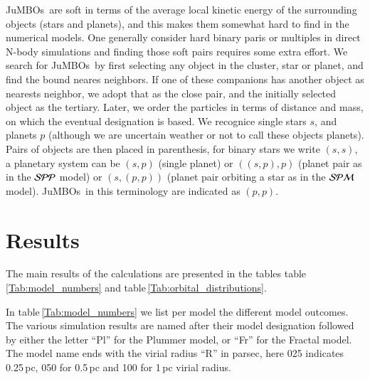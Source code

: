\documentclass[submission,phys]{lib/SciPost}
\newcommand{\jumbos}{\mbox{JuMBOs}}
\begin{document}
\jumbos\, are soft in terms of the average local kinetic energy of the
surrounding objects (stars and planets), and this makes them somewhat
hard to find in the numerical models.  One generally consider hard
binary paris or multiples in direct N-body simulations and finding
those soft pairs requires some extra effort.  We search for \jumbos\,
by first selecting any object in the cluster, star or planet, and find
the bound neares neighbors. If one of these companions has another
object as nearests neighbor, we adopt that as the close pair, and the
initially selected object as the tertiary. Later, we order the
particles in terms of distance and mass, on which the eventual
designation is based. We recognice single stars $s$, and planets $p$
(although we are uncertain weather or not to call these objects
planets). Pairs of objects are then placed in parenthesis, for binary
stars we write $(s,s)$, a planetary system can be $(s,p)$ (single
planet) or $((s,p),p)$ (planet pair as in the ${\cal SPP}$ model) or
$(s,(p,p))$ (planet pair orbiting a star as in the ${\cal SPM}$
model). \jumbos\, in this terminology are indicated as $(p,p)$.

\section{Results}

The main results of the calculations are presented in the tables
table\,\ref{Tab:model_numbers} and
table\,\ref{Tab:orbital_distributions}.

In table\,\ref{Tab:model_numbers} we list per model the different
model outcomes.  The various simulation results are named after their
model designation followed by either the letter ``Pl'' for the Plummer
model, or ``Fr'' for the Fractal model.  The model name ends with the
virial radius ``R'' in parsec, here 025 indicates 0.25\,pc, 050 for
0.5\,pc and 100 for 1\,pc virial radius.
\end{document}
